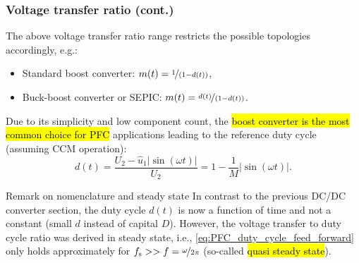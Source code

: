 \begin{frame}
    \frametitle{Voltage transfer ratio (cont.)} 
    The above voltage transfer ratio range restricts the possible topologies accordingly, e.g.:
    \begin{itemize}
        \item Standard boost converter: $m(t)=\nicefrac{1}{(1-d(t))}$,
        \item Buck-boost converter or SEPIC: $m(t)=\nicefrac{d(t)}{(1-d(t))}$.
    \end{itemize}\pause
    Due to its simplicity and low component count, the \hl{boost converter is the most common choice for PFC} applications leading to the reference duty cycle (assuming CCM operation):
    \begin{equation}
        d(t) = \frac{U_2-\hat{u}_1|\sin(\omega t)|}{U_2} = 1 - \frac{1}{M}|\sin(\omega t)|.
        \label{eq:PFC_duty_cycle_feed_forward}
    \end{equation}\pause 
    \begin{varblock}{Remark on nomenclature and steady state}
        In contrast to the previous DC/DC converter section, the duty cycle $d(t)$ is now a function of time and not a constant (small $d$ instead of capital $D$). However, the voltage transfer to duty cycle ratio was derived in steady state, i.e., \eqref{eq:PFC_duty_cycle_feed_forward} only holds approximately for $f_\mathrm{s}>> f=\nicefrac{\omega}{2\pi}$ (so-called \hl{quasi steady state}). 
    \end{varblock}
\end{frame}

